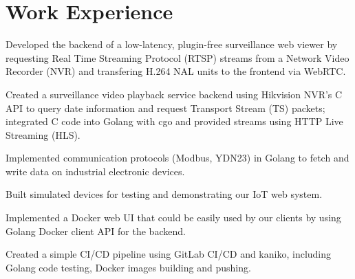 \documentclass[]{deedy-resume}
\begin{document}
\begin{minipage}[t]{0.66\textwidth} 

\section{Work Experience}

\vspace{\topsep} %
\begin{tightemize}
\item Developed the backend of a low-latency, plugin-free surveillance web viewer
by requesting Real Time Streaming Protocol (RTSP) streams from a Network Video Recorder (NVR) and transfering H.264 NAL units to the frontend via WebRTC.
\item Created a surveillance video playback service backend using Hikvision NVR's C API to query date information and request Transport Stream (TS) packets;
integrated C code into Golang with cgo and provided streams using HTTP Live Streaming (HLS).
\item Implemented communication protocols (Modbus, YDN23) in Golang to fetch and write data on industrial electronic devices.
\item Built simulated devices for testing and demonstrating our IoT web system.
\item Implemented a Docker web UI that could be easily used by our clients
by using Golang Docker client API for the backend.
\item Created a simple CI/CD pipeline using GitLab CI/CD and kaniko, including Golang code testing, Docker images building and pushing.
\end{tightemize}
\sectionsep


\end{minipage}
\end{document}
